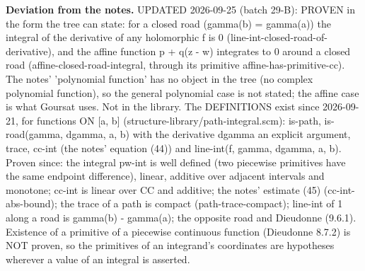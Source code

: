 \noindent\textbf{Deviation from the notes.} UPDATED 2026-09-25 (batch 29-B): PROVEN in the form the tree can state: for a closed road (gamma(b) = gamma(a)) the integral of the derivative of any holomorphic f is 0 (line-int-closed-road-of-derivative), and the affine function p + q(z - w) integrates to 0 around a closed road (affine-closed-road-integral, through its primitive affine-has-primitive-cc). The notes' 'polynomial function' has no object in the tree (no complex polynomial function), so the general polynomial case is not stated; the affine case is what Goursat uses. Not in the library. The DEFINITIONS exist since 2026-09-21, for functions ON [a, b] (structure-library/path-integral.scm): is-path, is-road(gamma, dgamma, a, b) with the derivative dgamma an explicit argument, trace, cc-int (the notes' equation (44)) and line-int(f, gamma, dgamma, a, b). Proven since: the integral pw-int is well defined (two piecewise primitives have the same endpoint difference), linear, additive over adjacent intervals and monotone; cc-int is linear over CC and additive; the notes' estimate (45) (cc-int-abs-bound); the trace of a path is compact (path-trace-compact); line-int of 1 along a road is gamma(b) - gamma(a); the opposite road and Dieudonne (9.6.1). Existence of a primitive of a piecewise continuous function (Dieudonne 8.7.2) is NOT proven, so the primitives of an integrand's coordinates are hypotheses wherever a value of an integral is asserted.
%
\renewcommand{\thethm}{3.4}
